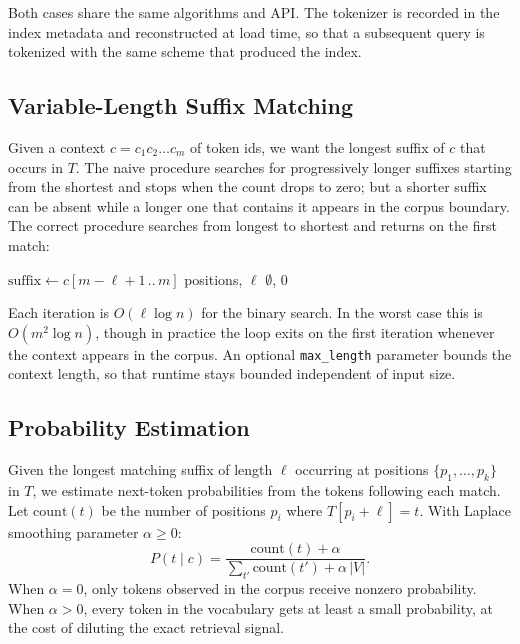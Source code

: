 \documentclass[11pt]{article}
\begin{document}
Both cases share the same algorithms and API. The tokenizer is recorded in the index metadata and reconstructed at load time, so that a subsequent query is tokenized with the same scheme that produced the index.

\subsection{Variable-Length Suffix Matching}

Given a context $c = c_1 c_2 \ldots c_m$ of token ids, we want the longest suffix of $c$ that occurs in $T$. The naive procedure searches for progressively longer suffixes starting from the shortest and stops when the count drops to zero; but a shorter suffix can be absent while a longer one that contains it appears in the corpus boundary. The correct procedure searches from longest to shortest and returns on the first match:

\begin{algorithmic}[1]
        \State $\text{suffix} \gets c[m-\ell+1\,..\,m]$
            \State \Return positions, $\ell$
        \EndIf
    \EndFor
    \State \Return $\emptyset$, $0$
\EndFunction
\end{algorithmic}

Each iteration is $O(\ell \log n)$ for the binary search. In the worst case this is $O(m^2 \log n)$, though in practice the loop exits on the first iteration whenever the context appears in the corpus. An optional \texttt{max\_length} parameter bounds the context length, so that runtime stays bounded independent of input size.

\subsection{Probability Estimation}

Given the longest matching suffix of length $\ell$ occurring at positions $\{p_1, \ldots, p_k\}$ in $T$, we estimate next-token probabilities from the tokens following each match. Let $\mathrm{count}(t)$ be the number of positions $p_i$ where $T[p_i + \ell] = t$. With Laplace smoothing parameter $\alpha \geq 0$:
\begin{equation}
    P(t \mid c) = \frac{\mathrm{count}(t) + \alpha}{\sum_{t'} \mathrm{count}(t') + \alpha \, |V|}.
\end{equation}
When $\alpha = 0$, only tokens observed in the corpus receive nonzero probability. When $\alpha > 0$, every token in the vocabulary gets at least a small probability, at the cost of diluting the exact retrieval signal.
\end{document}
